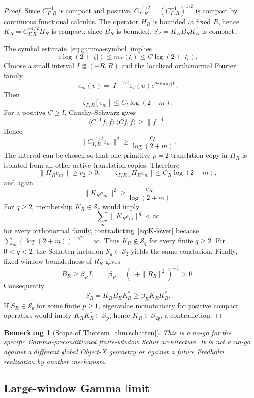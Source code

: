\documentclass[11pt,a4paper]{amsart}
\newtheorem{remark}[theorem]{Bemerkung}
\newcommand{\Sp}{\mathcal S}
\begin{document}
\begin{proof}
Since $C_{\Gamma,R}^{-1}$ is compact and positive,
$C_{\Gamma,R}^{-1/2}=(C_{\Gamma,R}^{-1})^{1/2}$ is compact by continuous functional
calculus.  The operator $H_R$ is bounded at fixed $R$, hence
$K_R=C_{\Gamma,R}^{-1/2}H_R$ is compact; since $B_R$ is bounded,
$S_R=K_RB_RK_R^*$ is compact.

The symbol estimate~\eqref{eq:gamma-symbol} implies
\[
 c\log(2+|\xi|)\le m_\Gamma(\xi)\le C\log(2+|\xi|).
\tag{3.8}\label{eq:gamma-log-bounds}
\]
Choose a small interval $I\Subset(-R,R)$ and the localized orthonormal Fourier family
\[
 e_m(u)=|I|^{-1/2}1_I(u)e^{2\pi imu/|I|}.
\]
Then
\[
 \mathfrak c_{\Gamma,R}[e_m]\le C_I\log(2+m).
\tag{3.9}\label{eq:gamma-local-family}
\]
For a positive $C\ge I$, Cauchy--Schwarz gives
\[
 \langle C^{-1}f,f\rangle\,\langle Cf,f\rangle\ge\|f\|^4.
\]
Hence
\[
 \|C_{\Gamma,R}^{-1/2}e_m\|^2\ge\frac{c_I}{\log(2+m)}.
\tag{3.10}\label{eq:gamma-inverse-lower}
\]
The interval can be chosen so that one primitive $p=2$ translation copy in $H_R$ is
isolated from all other active translation copies.  Therefore
\[
 \|H_Re_m\|\ge c_2>0,
 \qquad
 \mathfrak c_{\Gamma,R}[H_Re_m]\le C_R\log(2+m),
\]
and again
\[
 \|K_Re_m\|^2\ge\frac{c_R}{\log(2+m)}.
\tag{3.11}\label{eq:K-lower}
\]
For $q\ge2$, membership $K_R\in\Sp_q$ would imply
\[
 \sum_m\|K_Re_m\|^q<\infty
\]
for every orthonormal family, contradicting~\eqref{eq:K-lower} because
$\sum_m(\log(2+m))^{-q/2}=\infty$.  Thus $K_R\notin\Sp_q$ for every finite $q\ge2$.
For $0<q<2$, the Schatten inclusion $\Sp_q\subset\Sp_2$ yields the same conclusion.
Finally, fixed-window boundedness of $R_R$ gives
\[
 B_R\ge\beta_RI,
 \qquad
 \beta_R=(1+\|R_R\|^2)^{-1}>0.
\]
Consequently
\[
 S_R=K_RB_RK_R^*\ge\beta_RK_RK_R^*.
\]
If $S_R\in\Sp_p$ for some finite $p\ge1$, eigenvalue monotonicity for positive compact
operators would imply $K_RK_R^*\in\Sp_p$, hence $K_R\in\Sp_{2p}$, a contradiction.
\end{proof}

\begin{remark}[Scope of Theorem~\ref{thm:schatten}]\label{rem:schatten-scope}
This is a no-go for the \emph{specific} Gamma-preconditioned finite-window Schur
architecture.  It is not a no-go against a different global Object-X geometry or against
a future Fredholm realization by another mechanism.
\end{remark}

\subsection{Large-window Gamma limit}
\end{document}

